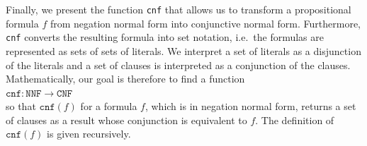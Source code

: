 Finally, we present the function \texttt{cnf} that allows us to transform a propositional formula $f$
from negation normal form into conjunctive normal form.
Furthermore, \texttt{cnf} converts the resulting formula
into set notation, i.e.~the formulas are represented as sets of sets of literals.  We interpret a set of literals as a
disjunction of the literals and a set of clauses is interpreted as a conjunction
of the clauses.  Mathematically, our goal is therefore to find a function
\\[0.2cm]
\hspace*{1.3cm}
$\texttt{cnf}: \texttt{NNF} \rightarrow \texttt{CNF}$
\\[0.2cm]
so that $\texttt{cnf}(f)$ for a formula $f$, which is in negation normal form, returns a set of clauses as a result whose conjunction
is equivalent to $f$.  The definition of $\texttt{cnf}(f)$ is given recursively.
